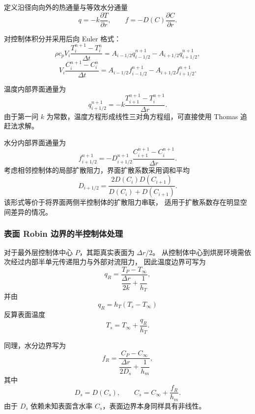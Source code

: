 \documentclass[UTF8,a4paper,12pt]{ctexart}
\begin{document}
定义沿径向向外的热通量与等效水分通量
\begin{equation}
q=-k\frac{\partial T}{\partial r},
\qquad
f=-D(C)\frac{\partial C}{\partial r}.
\end{equation}

对控制体积分并采用后向 Euler 格式：
\begin{equation}
\rho c_pV_i
\frac{T_i^{n+1}-T_i^n}{\Delta t}
=
A_{i-1/2}q_{i-1/2}^{n+1}
-
A_{i+1/2}q_{i+1/2}^{n+1},
\end{equation}
\begin{equation}
V_i
\frac{C_i^{n+1}-C_i^n}{\Delta t}
=
A_{i-1/2}f_{i-1/2}^{n+1}
-
A_{i+1/2}f_{i+1/2}^{n+1}.
\end{equation}

温度内部界面通量为
\begin{equation}
q_{i+1/2}^{n+1}
=
-k
\frac{
T_{i+1}^{n+1}-T_i^{n+1}
}{\Delta r}.
\end{equation}
由于第一问 $k$ 为常数，温度方程形成线性三对角方程组，可直接使用 Thomas 追赶法求解。

水分内部界面通量为
\begin{equation}
f_{i+1/2}^{n+1}
=
-D_{i+1/2}^{n+1}
\frac{
C_{i+1}^{n+1}-C_i^{n+1}
}{\Delta r}.
\end{equation}
考虑相邻控制体的局部扩散阻力，界面扩散系数采用调和平均
\begin{equation}
\boxed{
D_{i+1/2}
=
\frac{
2D(C_i)D(C_{i+1})
}{
D(C_i)+D(C_{i+1})
}
}.
\end{equation}
该形式等价于将界面两侧半控制体的扩散阻力串联，
适用于扩散系数存在明显空间差异的情况。

\subsubsection{表面 Robin 边界的半控制体处理}

对于最外层控制体中心 $P$，其距真实表面为 $\Delta r/2$。
从控制体中心到烘房环境需依次经过内部半单元传递阻力与外部对流阻力，
因此温度边界可写为
\begin{equation}
q_R
=
\frac{
T_P-T_\infty
}{
\dfrac{\Delta r}{2k}
+\dfrac1{h_T}
},
\end{equation}
并由
\begin{equation}
q_R=h_T(T_s-T_\infty)
\end{equation}
反算表面温度
\begin{equation}
T_s
=
T_\infty+\frac{q_R}{h_T}.
\end{equation}

同理，水分边界写为
\begin{equation}
f_R
=
\frac{
C_P-C_\infty
}{
\dfrac{\Delta r}{2D_s}
+\dfrac1{h_m}
},
\end{equation}
其中
\begin{equation}
D_s=D(C_s),
\qquad
C_s=C_\infty+\frac{f_R}{h_m}.
\end{equation}
由于 $D_s$ 依赖未知表面含水率 $C_s$，表面边界本身同样具有非线性。
\end{document}
